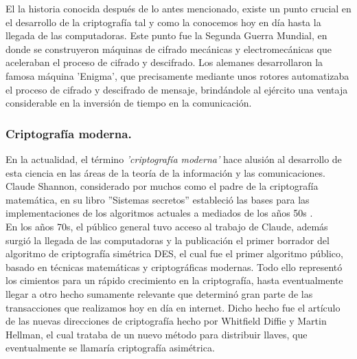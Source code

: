 \documentclass[12pt, a4paper, titlepage]{report}
\begin{document}
                El la historia conocida después de lo antes mencionado, existe un punto crucial en el desarrollo de la criptografía tal y como la conocemos hoy en día hasta la llegada de las computadoras. Este punto fue la Segunda Guerra Mundial, en donde se construyeron máquinas de cifrado mecánicas y electromecánicas que aceleraban el proceso de cifrado y descifrado. Los alemanes desarrollaron la famosa máquina 'Enigma', que precisamente mediante unos rotores automatizaba el proceso de cifrado y descifrado de mensaje, brindándole al ejército una ventaja considerable en la inversión de tiempo en la comunicación.
                
            \subsubsection{Criptografía moderna.}
                En la actualidad, el término \textit{'criptografía moderna'} hace alusión al desarrollo de esta ciencia en las áreas de la teoría de la información y las comunicaciones. Claude Shannon, considerado por muchos como el padre de la criptografía matemática, en su libro ''Sistemas secretos'' estableció las bases para las implementaciones de los algoritmos actuales a mediados de los años 50s \cite{refCriptografia}.\\
                En los años 70s, el público general tuvo acceso al trabajo de Claude, además surgió la llegada de las computadoras y la publicación el primer borrador del algoritmo de criptografía simétrica DES, el cual fue el primer algoritmo público, basado en técnicas matemáticas y criptográficas modernas. Todo ello representó los cimientos para un rápido crecimiento en la criptografía, hasta eventualmente llegar a otro hecho sumamente relevante que determinó gran parte de las transacciones que realizamos hoy en día en internet. Dicho hecho fue el artículo de las nuevas direcciones de criptografía hecho por Whitfield Diffie y Martin Hellman, el cual trataba de un nuevo método para distribuir llaves, que eventualmente se llamaría criptografía asimétrica.
                
\end{document}
